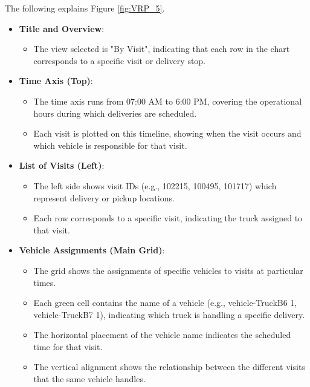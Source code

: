 \documentclass[a4paper,12pt, final]{article}
\begin{document}
The following explains Figure \ref{fig:VRP_5}.
\begin{itemize}

    \item \textbf{Title and Overview}:
        \begin{itemize}
            \item   The view selected is "By Visit", indicating that each row in the chart corresponds to a specific visit or delivery stop.
    \end{itemize}

\item \textbf{Time Axis (Top)}:
    \begin{itemize}
        \item The time axis runs from 07:00 AM to 6:00 PM, covering the operational hours during which deliveries are scheduled.
        \item Each visit is plotted on this timeline, showing when the visit occurs and which vehicle is responsible for that visit.
    \end{itemize}
\item \textbf{List of Visits (Left)}:
    \begin{itemize}
        \item The left side shows visit IDs (e.g., 102215, 100495, 101717) which represent delivery or pickup locations.
        \item Each row corresponds to a specific visit, indicating the truck assigned to that visit.
    \end{itemize}
\item \textbf{Vehicle Assignments (Main Grid)}:
    \begin{itemize}
        \item The grid shows the assignments of specific vehicles to visits at particular times.
        \item Each green cell contains the name of a vehicle (e.g., vehicle-TruckB6 1, vehicle-TruckB7 1), indicating which truck is handling a specific delivery.
        \item The horizontal placement of the vehicle name indicates the scheduled time for that visit.
        \item The vertical alignment shows the relationship between the different visits that the same vehicle handles.
    \end{itemize}
\end{itemize}
\newpage
\end{document}
